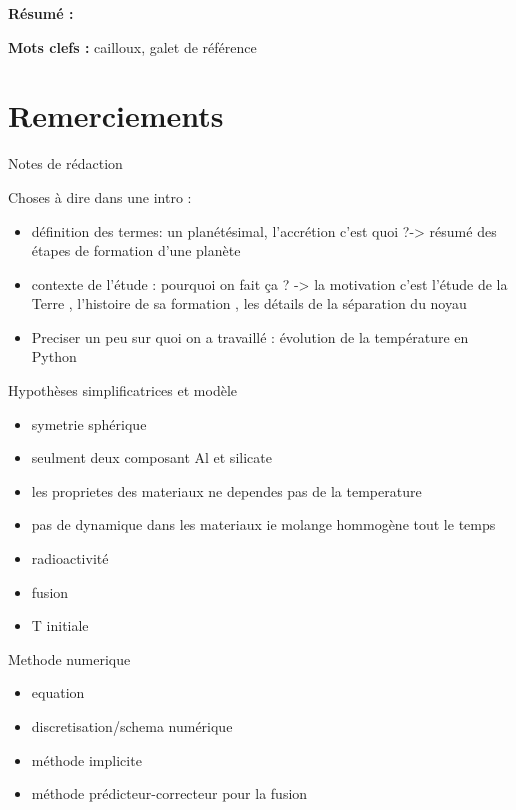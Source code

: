 \documentclass[10pt,a4paper]{article}
\numberwithin{equation}{section}
\begin{document}
\begin{titlepage}
\textbf{Résumé :} 
\vspace{0.3cm}

\textbf{Mots clefs :} cailloux, galet de référence
\vspace{0.3cm}


\end{titlepage}

\newpage

\renewcommand\thepage{}

\section*{Remerciements}




\tableofcontents


\newpage
\renewcommand\thepage{\arabic{page}}


\bigskip
\bigskip

Notes de rédaction

Choses à dire dans une intro :
\begin{itemize}
\item définition des termes: un planétésimal, l’accrétion c'est quoi ?-> résumé des étapes de formation d'une planète
\item contexte de l’étude : pourquoi on fait ça ? -> la motivation c'est l’étude de la Terre , l'histoire de sa formation , les détails de la séparation du noyau
\item Preciser un peu sur quoi on a travaillé : évolution de la température en Python
\end{itemize}

Hypothèses simplificatrices et modèle
\begin{itemize}
\item symetrie sphérique
\item seulment deux composant Al et silicate
\item les proprietes des materiaux ne dependes pas de la temperature
\item pas de dynamique dans les materiaux ie molange hommogène tout le temps
\item radioactivité
\item fusion
\item T initiale
\end{itemize}


Methode numerique
\begin{itemize}
\item equation
\item discretisation/schema numérique
\item méthode implicite 
\item méthode prédicteur-correcteur pour la fusion
\end{itemize}
\end{document}
